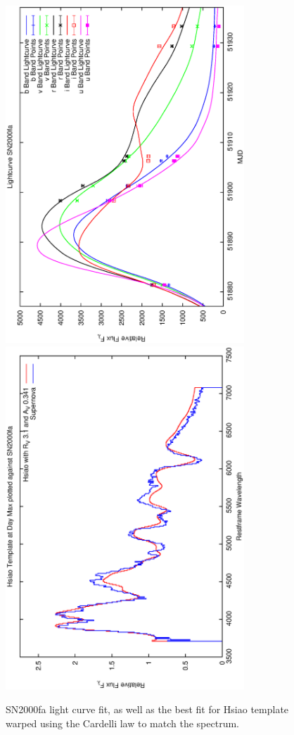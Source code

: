 \clearpage

\begin{figure}[p]
\centering
\includegraphics[angle=-90,width=0.8\textwidth]{./figures/ltcv/SN2000fa_v023_lightcurve.ps}
\hfill
\includegraphics[angle=-90,width=0.8\textwidth]{./figures/hsiao/SN2000fa_v001_hsiao.ps}
\hfill
\caption{SN2000fa light curve fit, as well as the best fit for Hsiao template warped using the Cardelli law to match the spectrum.}
\label{fig:SN2000fafour2}
\end{figure}

